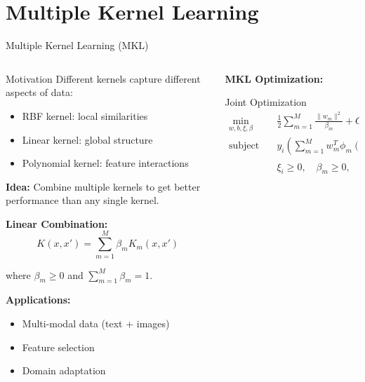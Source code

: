 \documentclass[8pt,aspectratio=1610]{beamer}
\begin{document}
\section{Multiple Kernel Learning}

\begin{frame}{Multiple Kernel Learning (MKL)}
\begin{columns}[t]
\begin{column}{0.48\textwidth}
\begin{block}{Motivation}
Different kernels capture different aspects of data:
\begin{itemize}
\setlength{\itemsep}{1pt}
\item RBF kernel: local similarities
\item Linear kernel: global structure
\item Polynomial kernel: feature interactions
\end{itemize}
\end{block}

\vspace{0.3cm}
\textbf{Idea:} Combine multiple kernels to get better performance than any single kernel.

\vspace{0.3cm}
\textbf{Linear Combination:}
$$K(x, x') = \sum_{m=1}^M \beta_m K_m(x, x')$$

where $\beta_m \geq 0$ and $\sum_{m=1}^M \beta_m = 1$.

\vspace{0.3cm}
\textbf{Applications:}
\begin{itemize}
\setlength{\itemsep}{1pt}
\item Multi-modal data (text + images)
\item Feature selection
\item Domain adaptation
\end{itemize}
\end{column}

\begin{column}{0.48\textwidth}
\textbf{MKL Optimization:}
\vspace{0.2cm}

\begin{block}{Joint Optimization}
\begin{align}
\min_{w,b,\xi,\beta} \quad &\frac{1}{2}\sum_{m=1}^M \frac{\|w_m\|^2}{\beta_m} + C\sum_{i=1}^n \xi_i \\
\text{subject to} \quad &y_i\left(\sum_{m=1}^M w_m^T \phi_m(x_i) + b\right) \geq 1 - \xi_i \\
&\xi_i \geq 0, \quad \beta_m \geq 0, \quad \sum_{m=1}^M \beta_m = 1
\end{align}
\end{block}


\end{column}
\end{columns}
\end{frame}
\end{document}
